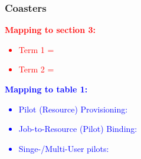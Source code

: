 \documentclass{sig-alternate}
\begin{document}



\subsubsection{Coasters}

\textcolor{red}
{
\textbf{Mapping to section 3:}
\begin{itemize}
\item Term 1 =
\item Term 2 =
\end{itemize}
}

\textcolor{blue}
{
\textbf{Mapping to table 1:}
\begin{itemize}
\item Pilot (Resource) Provisioning:
\item Job-to-Resource (Pilot) Binding:
\item Singe-/Multi-User pilots:
\end{itemize}
}

\end{document}
